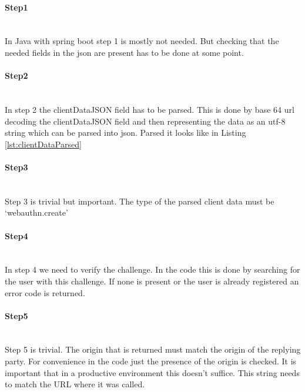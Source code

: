 \documentclass[a4paper, 11pt]{scrartcl}
\begin{document}


\paragraph{Step1} \hfill \\ 
In Java with spring boot step 1 is mostly not needed. But checking that the needed fields in the json are present has to be done at some point.
\paragraph{Step2} \hfill \\ 
In step 2 the clientDataJSON field has to be parsed. This is done by base 64 url decoding the clientDataJSON field and then representing the data as an utf-8 string which can be parsed into \gls{json}. Parsed it looks like in Listing \ref{lst:clientDataParsed}



\paragraph{Step3}\hfill \\ 
Step 3 is trivial but important. The type of the parsed client data must be `webauthn.create'

\paragraph{Step4}\hfill \\ 
In step 4 we need to verify the challenge. In the code this is done by searching for the user with this challenge. If none is present or the user is already registered an error code is returned.

\paragraph{Step5}\hfill \\ 
Step 5 is trivial. The origin that is returned must match the origin of the replying party. For convenience in the code just the presence of the origin is checked. It is important that in a productive environment this doesn't suffice. This string needs to match the URL where it was called.
\end{document}
